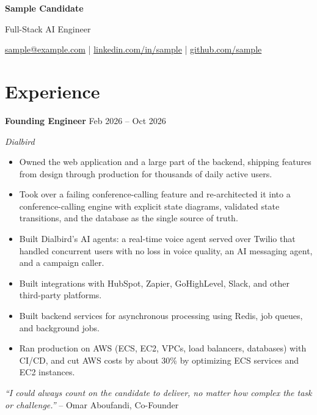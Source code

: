 \documentclass[a4paper,10pt]{article}
\newcommand{\role}[3]{\textbf{#1} \hfill #3\par\textit{#2}\par}
\begin{document}
\begin{center}
{\LARGE\textbf{Sample Candidate}}\par\vspace{4pt}
{\normalsize Full-Stack AI Engineer}\par\vspace{3pt}
\small
\href{mailto:sample@example.com}{sample@example.com} | \href{https://linkedin.com/in/sample}{linkedin.com/in/sample} | \href{https://github.com/sample}{github.com/sample}
\end{center}

\section{Experience}
\role{Founding Engineer}{Dialbird}{Feb 2026 -- Oct 2026}
\begin{itemize}
    \item Owned the web application and a large part of the backend, shipping features from design through production for thousands of daily active users.
    \item Took over a failing conference-calling feature and re-architected it into a conference-calling engine with explicit state diagrams, validated state transitions, and the database as the single source of truth.
    \item Built Dialbird's AI agents: a real-time voice agent served over Twilio that handled concurrent users with no loss in voice quality, an AI messaging agent, and a campaign caller.
    \item Built integrations with HubSpot, Zapier, GoHighLevel, Slack, and other third-party platforms.
    \item Built backend services for asynchronous processing using Redis, job queues, and background jobs.
    \item Ran production on AWS (ECS, EC2, VPCs, load balancers, databases) with CI/CD, and cut AWS costs by about 30\% by optimizing ECS services and EC2 instances.
\end{itemize}
\textit{``I could always count on the candidate to deliver, no matter how complex the task or challenge.''} -- Omar Aboufandi, Co-Founder\par
\vspace{3pt}
\end{document}
